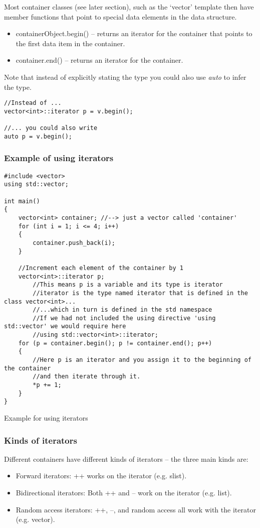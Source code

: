Most container classes (see later section), such as the `vector' template then have member functions
that point to special data elements in the data structure.

\begin{itemize}
	\item containerObject.begin() -- returns an iterator for the container that points to the
	first data item in the container.
	\item container.end() -- returns an iterator for the container.
\end{itemize}

Note that instead of explicitly stating the type you could also use \emph{auto} to infer the type.
\begin{verbatim}
//Instead of ...
vector<int>::iterator p = v.begin();

//... you could also write
auto p = v.begin();
\end{verbatim}


\subsubsection*{Example of using iterators}
\begin{listing}[H]
\begin{verbatim}
#include <vector>
using std::vector;

int main()
{
	vector<int> container; //--> just a vector called 'container'
	for (int i = 1; i <= 4; i++)
	{
		container.push_back(i);
	}
	
	//Increment each element of the container by 1 
	vector<int>::iterator p;
		//This means p is a variable and its type is iterator
		//iterator is the type named iterator that is defined in the class vector<int>...
		//...which in turn is defined in the std namespace
		//If we had not included the using directive 'using std::vector' we would require here
		//using std::vector<int>::iterator;
	for (p = container.begin(); p != container.end(); p++)
	{
		//Here p is an iterator and you assign it to the beginning of the container
		//and then iterate through it.
		*p += 1;
	}
}
\end{verbatim}
\caption{Example for using iterators}
\label{source_code_1}
\end{listing}


\subsubsection{Kinds of iterators}
Different containers have different kinds of iterators -- the three main kinds are:
\begin{itemize}
	\item Forward iterators: ++ works on the iterator (e.g. slist).
	\item Bidirectional iterators: Both ++ and -- work on the iterator (e.g. list).
	\item Random access iterators: ++, --, and random access all work with the
	iterator (e.g. vector).
\end{itemize}

